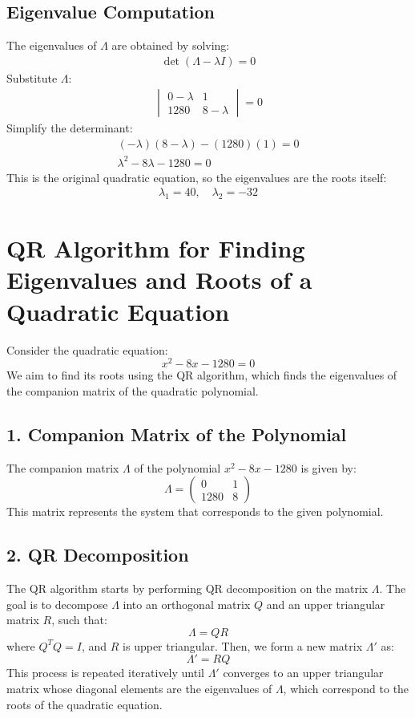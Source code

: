 \documentclass[journal]{IEEEtran}
\begin{document}
\subsection*{Eigenvalue Computation}
The eigenvalues of \( \Lambda \) are obtained by solving:
\begin{align}
    \det(\Lambda - \lambda I) = 0
\end{align}
Substitute \( \Lambda \):
\begin{align}
    \begin{vmatrix}
        0 - \lambda & 1 \\
        1280 & 8 - \lambda
    \end{vmatrix}
    = 0
\end{align}
Simplify the determinant:
\begin{align}
    (-\lambda)(8 - \lambda) - (1280)(1) = 0 \\
    \lambda^2 - 8\lambda - 1280 = 0
\end{align}
This is the original quadratic equation, so the eigenvalues are the roots itself:
\begin{align}
    \lambda_1 = 40, \quad \lambda_2 = -32
\end{align}
\section*{QR Algorithm for Finding Eigenvalues and Roots of a Quadratic Equation}

Consider the quadratic equation:
\[
x^2 - 8x - 1280 = 0
\]
We aim to find its roots using the QR algorithm, which finds the eigenvalues of the companion matrix of the quadratic polynomial.

\subsection*{1. Companion Matrix of the Polynomial}
The companion matrix \( \Lambda \) of the polynomial \( x^2 - 8x - 1280 \) is given by:
\[
\Lambda 
= \begin{pmatrix}
0 & 1 \\
1280 & 8
\end{pmatrix}
\]
This matrix represents the system that corresponds to the given polynomial.
\subsection*{2. QR Decomposition}
The QR algorithm starts by performing QR decomposition on the matrix \( \Lambda \). The goal is to decompose \( \Lambda \) into an orthogonal matrix \( Q \) and an upper triangular matrix \( R \), such that:
\[
\Lambda = QR
\]
where \( Q^T Q = I \), and \( R \) is upper triangular. Then, we form a new matrix \( \Lambda' \) as:
\[
\Lambda' = RQ
\]
This process is repeated iteratively until \( \Lambda' \) converges to an upper triangular matrix whose diagonal elements are the eigenvalues of \( \Lambda \), which correspond to the roots of the quadratic equation.
\end{document}
